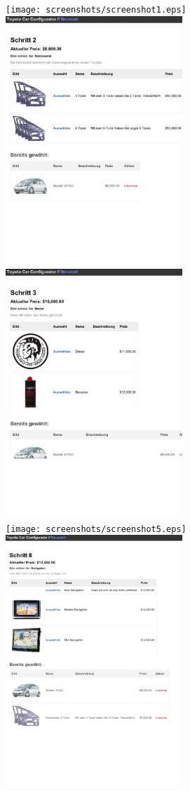 \documentclass[a4paper,10pt]{article}
\begin{document}
\texttt{[image: screenshots/screenshot1.eps]}
\\
\includegraphics[width=0.5\textwidth]{screenshots/screenshot2.eps}
\\
\includegraphics[width=0.5\textwidth]{screenshots/screenshot4.eps}
\\
\texttt{[image: screenshots/screenshot5.eps]}
\\
\includegraphics[width=0.5\textwidth]{screenshots/screenshot6.eps}
\end{document}
